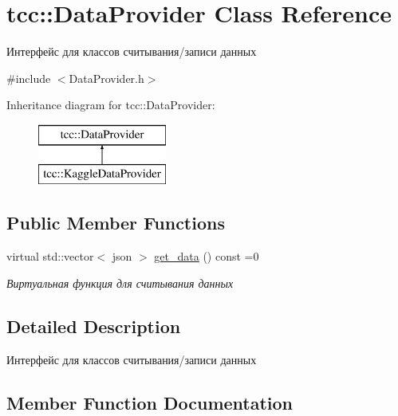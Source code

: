 \hypertarget{classtcc_1_1_data_provider}{}\section{tcc\+:\+:Data\+Provider Class Reference}
\label{classtcc_1_1_data_provider}


Интерфейс для классов считывания/записи данных  




{\ttfamily \#include $<$Data\+Provider.\+h$>$}

Inheritance diagram for tcc\+:\+:Data\+Provider\+:\begin{figure}[H]
\begin{center}
\leavevmode
\includegraphics[height=2.000000cm]{classtcc_1_1_data_provider}
\end{center}
\end{figure}
\subsection*{Public Member Functions}
\begin{DoxyCompactItemize}
\item 
virtual std\+::vector$<$ json $>$ \hyperlink{classtcc_1_1_data_provider_af5a33d2b9d234e39547a148b8f99cf6f}{get\+\_\+data} () const  =0
\begin{DoxyCompactList}\small\item\em Виртуальная функция для считывания данных \end{DoxyCompactList}\end{DoxyCompactItemize}


\subsection{Detailed Description}
Интерфейс для классов считывания/записи данных 

\subsection{Member Function Documentation}
